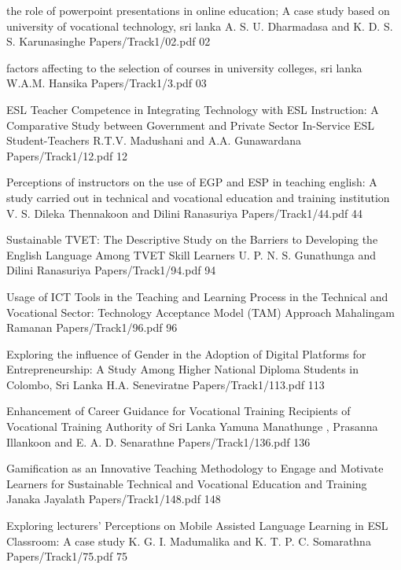 \addpaper
{the role of powerpoint presentations in online education; A case study based on university of vocational technology, sri lanka}
{A. S. U. Dharmadasa and K. D. S. S. Karunasinghe}
{Papers/Track1/02.pdf}
{02}


\addpaper
{factors affecting to the selection of courses in university colleges, sri lanka}
{W.A.M. Hansika}
{Papers/Track1/3.pdf}
{03}




   \addpaper
{ESL Teacher Competence in Integrating Technology with ESL Instruction: A Comparative Study between Government and Private Sector In-Service ESL Student-Teachers}
 {R.T.V. Madushani and A.A. Gunawardana} 
 {Papers/Track1/12.pdf}
   {12} 


\addpaper
{Perceptions of instructors on the use of EGP and ESP in teaching english: A study carried out in technical and vocational education and training institution}
{V. S. Dileka Thennakoon and Dilini Ranasuriya}
{Papers/Track1/44.pdf}
{44}


\addpaper
{Sustainable TVET: The Descriptive Study on the Barriers to Developing the English Language Among TVET Skill Learners}
{U. P. N. S. Gunathunga and Dilini Ranasuriya}
{Papers/Track1/94.pdf}
{94}


   \addpaper
{Usage of ICT Tools in the Teaching and Learning Process in the Technical and Vocational Sector: Technology Acceptance Model (TAM) Approach}
 {Mahalingam Ramanan} 
 {Papers/Track1/96.pdf}
   {96} 


\addpaper
{Exploring the influence of Gender in the Adoption of Digital Platforms for Entrepreneurship: A Study Among Higher National Diploma Students in Colombo, Sri Lanka}
{H.A. Seneviratne}
{Papers/Track1/113.pdf}
{113}

\addpaper
{Enhancement of Career Guidance for Vocational Training Recipients of Vocational Training Authority of Sri Lanka}
{Yamuna Manathunge , Prasanna Illankoon and E. A. D. Senarathne}
{Papers/Track1/136.pdf}
{136}


\addpaper
{Gamification as an Innovative Teaching Methodology to Engage and Motivate Learners for Sustainable Technical and Vocational Education and Training}
{Janaka Jayalath}
{Papers/Track1/148.pdf}
{148}



\addpaper
{Exploring lecturers' Perceptions on Mobile Assisted Language Learning in ESL Classroom: A case study}
{K. G. I. Madumalika and K. T. P. C. Somarathna}
{Papers/Track1/75.pdf}
{75}
